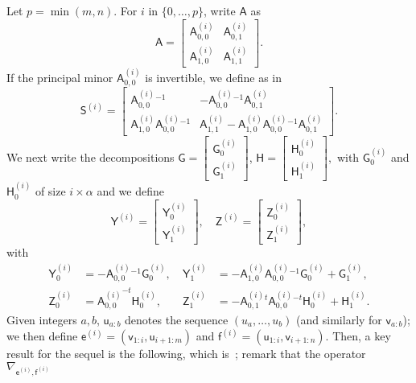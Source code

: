 \documentclass{sig-alternate}
\newcommand{\ve}{\ensuremath{\mathsf{e}}}
\newcommand{\vf}{\ensuremath{\mathsf{f}}}
\newcommand{\vu}{\ensuremath{\mathsf{u}}}
\newcommand{\vv}{\ensuremath{\mathsf{v}}}
\newcommand{\mA}{\ensuremath{\mathsf{A}}}
\newcommand{\mG}{\ensuremath{\mathsf{G}}}
\newcommand{\mH}{\ensuremath{\mathsf{H}}}
\newcommand{\mS}{\ensuremath{\mathsf{S}}}
\newcommand{\mY}{\ensuremath{\mathsf{Y}}}
\newcommand{\mZ}{\ensuremath{\mathsf{Z}}}
\begin{document}
Let $p=\min(m,n)$. For $i$ in $\{0,\dots,p\}$, write $\mA$ as
$$\mA=\left [\begin{matrix} {\mA^{(i)}_{0,0}} & \mA^{(i)}_{0,1} \\[1mm] \mA^{(i)}_{1,0} & \mA^{(i)}_{1,1}
\end{matrix}\right ].$$ 
If the principal minor
 ${\mA^{(i)}_{0,0}}$  is invertible, we define as in~\cite{Cardinal99}
$$\mS^{(i)} = \left [\begin{matrix} {\mA^{(i)}_{0,0}}{}^{-1} & -{\mA^{(i)}_{0,0}}{}^{-1} \mA^{(i)}_{0,1} \\[1mm] \mA^{(i)}_{1,0} {\mA^{(i)}_{0,0}}{}^{-1}& \mA^{(i)}_{1,1} - \mA^{(i)}_{1,0} {\mA^{(i)}_{0,0}}{}^{-1} \mA^{(i)}_{0,1} 
\end{matrix}\right ].$$
We next write the decompositions $\mG=\left [\begin{matrix}
    \mG^{(i)}_0 \\    \mG^{(i)}_1 
  \end{matrix}\right ]$, $\mH=\left [\begin{matrix} 
        \mH^{(i)}_0 \\    \mH^{(i)}_1 
  \end{matrix}\right ],$
with $\mG^{(i)}_0$ and $\mH^{(i)}_0$ of size $i \times \alpha$
and
we define
\begin{equation}
\mY^{(i)}
 = \left [\begin{matrix}
  \mY^{(i)}_0 \\    \mY^{(i)}_1 
     \end{matrix} \right ],\quad
\mZ^{(i)}
 = \left [\begin{matrix}
  \mZ^{(i)}_0 \\    \mZ^{(i)}_1 
     \end{matrix} \right ],
\end{equation}
with
\begin{align}
\mY^{(i)}_0&= -{\mA^{(i)}_{0,0}}{}^{-1} \mG^{(i)}_0,\  
&\mY^{(i)}_1&=-\mA^{(i)}_{1,0}{\mA^{(i)}_{0,0}}{}^{-1}\mG^{(i)}_0 + \mG^{(i)}_1,\label{eq:defYi}\\
\mZ^{(i)}_0&= {\mA^{(i)}_{0,0}}^{-t} \mH^{(i)}_0,\  
&\mZ^{(i)}_1&=-{\mA^{(i)}_{0,1}}{}^t{\mA^{(i)}_{0,0}}{}^{-t}\mH^{(i)}_0 + \mH^{(i)}_1\label{eq:defZi}.
\end{align}
Given integers $a,b$, $\vu_{a:b}$ denotes the sequence
$(u_a,\dots,u_b)$ (and similarly for $\vv_{a:b}$); we then
define $\ve^{(i)}=(\vv_{1:i},\vu_{i+1:m})$ and
$\vf^{(i)}=(\vu_{1:i},\vv_{i+1:n})$.
Then, a key result for the sequel is the following, which
is~\cite[Proposition~1]{Cardinal99}; remark that the operator $\nabla_{\ve^{(i)},\vf^{(i)}}$
\end{document}
